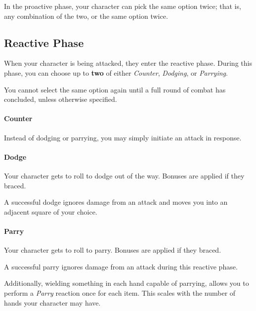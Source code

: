 \note In the proactive phase, your character can pick the same option twice; that is, any combination of the two, or the same option twice.

\subsection{Reactive Phase}
When your character is being attacked, they enter the reactive phase.
During this phase, you can choose up to \textbf{two} of either \textit{Counter}, \textit{Dodging}, or \textit{Parrying}.

You cannot select the same option again until a full round of combat has concluded, unless otherwise specified.

\paragraph{Counter}
Instead of dodging or parrying, you may simply initiate an attack in response.

\paragraph{Dodge}
Your character gets to roll to dodge out of the way.
Bonuses are applied if they braced.

A successful dodge ignores damage from an attack and moves you into an adjacent square of your choice.

\paragraph{Parry}
Your character gets to roll to parry.
Bonuses are applied if they braced.

A successful parry ignores damage from an attack during this reactive phase.

Additionally, wielding something in each hand capable of parrying, allows you to perform a \textit{Parry} reaction once for each item.
This scales with the number of hands your character may have.